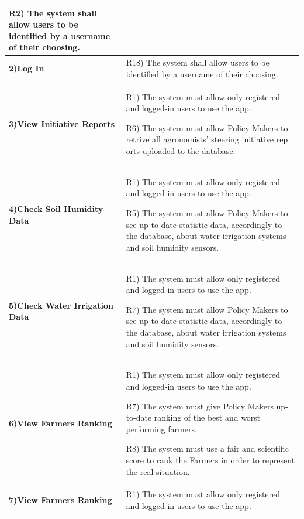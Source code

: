 \documentclass[table, 12pt]{article}
\begin{document}
\begin{itemize}
\begin{longtable}{|p{}|p{}|}
                                                                     R2) The system shall allow users to be identified by a username of their choosing.\\\hline
                    \cellcolor{SpringGreen!50}\textbf{2)Log In}\centering & R18) The system shall allow users to be identified by a username of their choosing. \\\hline
                    \cellcolor{SpringGreen!50}\textbf{3)View Initiative Reports}\centering &  R1) The system must allow only registered and logged-in users to use the app.

                                                                                              R6) The system must allow Policy Makers to retrive all agronomists' steering initiative rep orts uploaded to the database.\\\hline
                    \cellcolor{SpringGreen!50}\textbf{4)Check Soil Humidity Data}\centering &  R1) The system must allow only registered and logged-in users to use the app.

                                                                                               R5) The system must allow Policy Makers to see up-to-date statistic data, accordingly to the database, about water irrigation systems and soil humidity sensors.\\\hline
                    \cellcolor{SpringGreen!50}\textbf{5)Check Water Irrigation Data}\centering &  R1) The system must allow only registered and logged-in users to use the app.

                                                                                                  R7) The system must allow Policy Makers to see up-to-date statistic data, accordingly to the database, about water irrigation systems and soil humidity sensors.\\\hline
                    
                    \cellcolor{SpringGreen!50}\textbf{6)View Farmers Ranking}\centering &  R1) The system must allow only registered and logged-in users to use the app.

                                                                                           R7) The system must give Policy Makers up-to-date ranking of the best and worst performing farmers.

                                                                                           R8) The system must use a fair and scientific score to rank the Farmers in order to represent the real situation.\\\hline
                    \cellcolor{SpringGreen!50}\textbf{7)View Farmers Ranking}\centering &  R1) The system must allow only registered and logged-in users to use the app.


\end{longtable}
\end{itemize}
\end{document}
